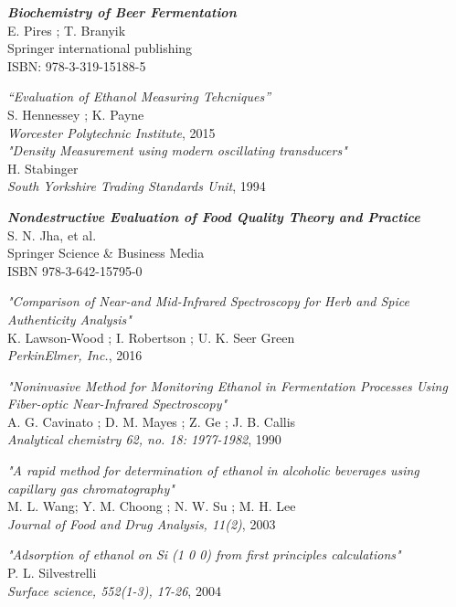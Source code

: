 \documentclass[twoside]{ctuthesis}
\theoremstyle{plain}
\theoremstyle{definition}
\theoremstyle{note}
\begin{document}
\begin{thebibliography}{9}
	\textit{\textbf{Biochemistry of Beer Fermentation}}\\
	E. Pires ; T. Branyik \\
	Springer international publishing\\
	ISBN: 978-3-319-15188-5

	\textit{“Evaluation of Ethanol Measuring Tehcniques”}\\
	S. Hennessey ; K. Payne\\
	\textit{Worcester Polytechnic Institute}, 2015\\

	\textit{"Density Measurement using modern oscillating transducers"}\\
	H. Stabinger\\
	\textit{South Yorkshire Trading Standards Unit}, 1994

	\textit{\textbf{Nondestructive Evaluation of Food Quality Theory and Practice}}\\
	S. N. Jha, et al.\\
	Springer Science \& Business Media\\
	ISBN 978-3-642-15795-0

	\textit{"Comparison of Near-and Mid-Infrared Spectroscopy for Herb and Spice Authenticity Analysis"}\\
	K. Lawson-Wood ; I. Robertson ; U. K. Seer Green\\
	\textit{PerkinElmer, Inc.}, 2016

	\textit{"Noninvasive Method for Monitoring Ethanol in Fermentation Processes Using Fiber-optic Near-Infrared Spectroscopy"}\\
	A. G. Cavinato ; D. M. Mayes ; Z. Ge ; J. B. Callis\\
	\textit{Analytical chemistry 62, no. 18: 1977-1982}, 1990

	\textit{"A rapid method for determination of ethanol in alcoholic beverages using capillary gas chromatography"}\\
	M. L. Wang; Y. M. Choong ; N. W. Su ; M. H. Lee\\
	\textit{Journal of Food and Drug Analysis, 11(2)}, 2003

	\textit{"Adsorption of ethanol on Si (1 0 0) from first principles calculations"}\\
	P. L. Silvestrelli\\
	\textit{Surface science, 552(1-3), 17-26}, 2004


\end{thebibliography}
\end{document}
